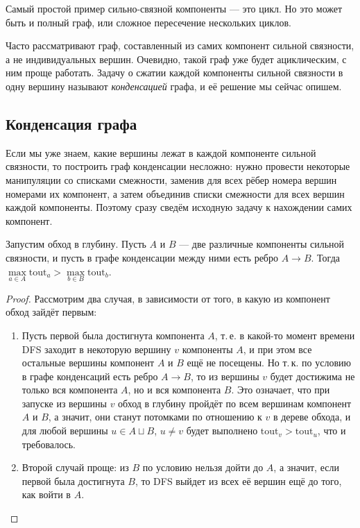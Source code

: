Самый простой пример сильно-связной компоненты --- это цикл. Но это может быть и полный граф, или сложное пересечение нескольких циклов.

Часто рассматривают граф, составленный из самих компонент сильной связности, а не индивидуальных вершин. Очевидно, такой граф уже будет ациклическим, с ним проще работать. Задачу о сжатии каждой компоненты сильной связности в одну вершину называют \textit{конденсацией} графа, и её решение мы сейчас опишем.

\subsection{Конденсация графа}

Если мы уже знаем, какие вершины лежат в каждой компоненте сильной связности, то построить граф конденсации несложно: нужно провести некоторые манипуляции со списками смежности, заменив для всех рёбер номера вершин номерами их компонент, а затем объединив списки смежности для всех вершин каждой компоненты. Поэтому сразу сведём исходную задачу к нахождении самих компонент.

\begin{lemma}
    Запустим обход в глубину. Пусть $A$ и $B$ --- две различные компоненты сильной связности, и пусть в графе конденсации между ними есть ребро $A \to B$. Тогда $\max\limits_{a \in A}\mathrm{tout}_a > \max\limits_{b \in B}\mathrm{tout}_b$.
\end{lemma}

\begin{proof}
    Рассмотрим два случая, в зависимости от того, в какую из компонент обход зайдёт первым:
    \begin{enumerate}[nolistsep]
        \item Пусть первой была достигнута компонента $A$, т.\,е. в какой-то момент времени DFS заходит в некоторую вершину $v$ компоненты $A$, и при этом все остальные вершины компонент $A$ и $B$ ещё не посещены. Но т.\,к. по условию в графе конденсаций есть ребро $A \to B$, то из вершины $v$ будет достижима не только вся компонента $A$, но и вся компонента $B$. Это означает, что при запуске из вершины $v$ обход в глубину пройдёт по всем вершинам компонент $A$ и $B$, а значит, они станут потомками по отношению к $v$ в дереве обхода, и для любой вершины $u \in A \sqcup B$, $u \ne v$ будет выполнено $\mathrm{tout}_v > \mathrm{tout}_u$, что и требовалось.
        \item Второй случай проще: из $B$ по условию нельзя дойти до $A$, а значит, если первой была достигнута $B$, то DFS выйдет из всех её вершин ещё до того, как войти в $A$.
    \end{enumerate}
\end{proof}

